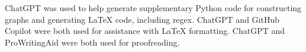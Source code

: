 \label{acknowledgements}

ChatGPT was used to help generate supplementary Python code for constructing
graphs and generating \LaTeX{} code, including regex. ChatGPT and GitHub
Copilot were both used for assistance with \LaTeX{} formatting. ChatGPT and
ProWritingAid were both used for proofreading.
